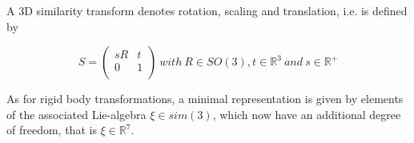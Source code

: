 A 3D similarity transform   denotes rotation, scaling and translation, i.e. is defined by

\begin{equation}
S=\left(
    \begin{array}{cc}
      sR & t \\
      0 & 1 \\
    \end{array}
  \right)
  \ with
  \ R\in SO(3),t\in {\mathbb{R}}^{3}
  \ and \ s\in {\mathbb{R}}^{+}
\end{equation}

As for rigid body transformations, a minimal representation is given by elements of the associated Lie-algebra $\xi  \in sim(3)$, which now have an additional degree of freedom, that is $\xi\in {\mathbb{R}}^{7}$.









